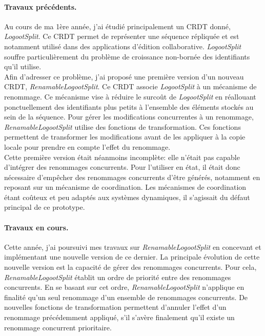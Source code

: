 \documentclass[12pt]{article}
\begin{document}
\paragraph{\small Travaux précédents.}
Au cours de ma 1ère année, j'ai étudié principalement un \ac{CRDT} donné, \emph{LogootSplit}.
Ce \ac{CRDT} permet de représenter une séquence répliquée et est notamment utilisé dans des applications d'édition collaborative.
\emph{LogootSplit} souffre particulièrement du problème de croissance non-bornée des identifiants qu'il utilise.
\\

Afin d'adresser ce problème, j'ai proposé une première version d'un nouveau \ac{CRDT}, \emph{RenamableLogootSplit}.
Ce \ac{CRDT} associe \emph{LogootSplit} à un mécanisme de renommage.
Ce mécanisme vise à réduire le surcoût de \emph{LogootSplit} en réallouant ponctuellement des identifiants plus petits à l'ensemble des éléments stockés au sein de la séquence.
Pour gérer les modifications concurrentes à un renommage, \emph{RenamableLogootSplit} utilise des fonctions de transformation.
Ces fonctions permettent de transformer les modifications avant de les appliquer à la copie locale pour prendre en compte l'effet du renommage.
\\

Cette première version était néanmoins incomplète: elle n'était pas capable d'intégrer des renommages concurrents.
Pour l'utiliser en état, il était donc nécessaire d'empêcher des renommages concurrents d'être générés, notamment en reposant sur un mécanisme de coordination.
Les mécanismes de coordination étant coûteux et peu adaptés aux systèmes dynamiques, il s'agissait du défaut principal de ce prototype.

\paragraph{\small Travaux en cours.}
Cette année, j'ai poursuivi mes travaux sur \emph{RenamableLogootSplit} en concevant et implémentant une nouvelle version de ce dernier.
La principale évolution de cette nouvelle version est la capacité de gérer des renommages concurrents.
Pour cela, \emph{RenamableLogootSplit} établit un ordre de priorité entre des renommages concurrents.
En se basant sur cet ordre, \emph{RenamableLogootSplit} n'applique en finalité qu'un seul renommage d'un ensemble de renommages concurrents.
De nouvelles fonctions de transformation permettent d'annuler l'effet d'un renommage précédemment appliqué, s'il s'avère finalement qu'il existe un renommage concurrent prioritaire.
\\
\end{document}
